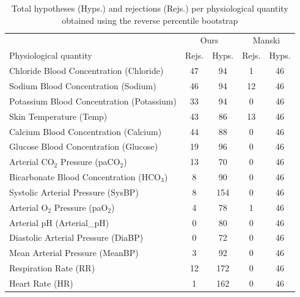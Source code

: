 \begin{table}[t]
\centering
\begin{footnotesize}
\begin{tabular}{l|cc|cc}
& \multicolumn{2}{c}{Ours} & \multicolumn{2}{c}{Manski} \\
                   Physiological quantity &  Rejs. &  Hyps. &  Rejs. &  Hyps. \\
\midrule
  Chloride Blood Concentration (Chloride) &            47 &            94 & 1 & 46 \\
      Sodium Blood Concentration (Sodium) &            46 &            94 & 12 & 46 \\
Potassium Blood Concentration (Potassium) &            33 &            94 & 0 & 46 \\
                  Skin Temperature (Temp) &            43 &            86 & 13 & 46 \\
    Calcium Blood Concentration (Calcium) &            44 &            88 & 0 & 46 \\
    Glucose Blood Concentration (Glucose) &            19 &            96 & 0 & 46 \\
      Arterial CO$_2$ Pressure (paCO$_2$) &            13 &            70 & 0 & 46 \\
Bicarbonate Blood Concentration (HCO$_3$) &             8 &            90 & 0 & 46 \\
       Systolic Arterial Pressure (SysBP) &             8 &           154 & 0 & 46 \\
        Arterial O$_2$ Pressure (paO$_2$) &             4 &            78 & 1 & 46 \\
                Arterial pH (Arterial\_pH) &             0 &            80 & 0 & 46 \\
      Diastolic Arterial Pressure (DiaBP) &             0 &            72 & 0 & 46 \\
          Mean Arterial Pressure (MeanBP) &             3 &            92 & 0 & 46 \\
                    Respiration Rate (RR) &            12 &           172 & 0 & 46 \\
                          Heart Rate (HR) &             1 &           162 & 0 & 46 \\
\bottomrule
\end{tabular}
\end{footnotesize}
\caption{Total hypotheses (Hyps.) and rejections (Rejs.) per physiological quantity obtained using the reverse percentile bootstrap}  \label{tab:hypotheses_rev_percentile}
\end{table}


